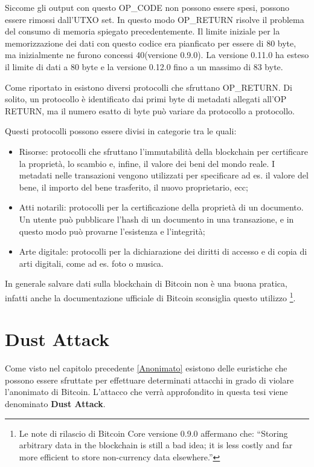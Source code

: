 Siccome gli output con questo OP\_CODE non possono essere spesi, possono essere rimossi dall'UTXO set. In questo modo OP\_RETURN risolve il problema del consumo di memoria spiegato precedentemente. Il limite iniziale per la memorizzazione dei dati con questo codice era pianficato per essere di 80 byte, ma inizialmente ne furono concessi 40(versione 0.9.0).  La versione 0.11.0 \cite{v11} ha esteso il limite di dati a 80 byte e la versione 0.12.0 \cite{v12} fino a un massimo di 83 byte. 

Come riportato in \cite{OP_RETURN} esistono diversi protocolli che sfruttano OP\_RETURN. Di solito, un protocollo è identificato dai primi byte di metadati allegati all'OP RETURN, ma il numero esatto di byte può variare da protocollo a
protocollo. 

Questi protocolli possono essere divisi in categorie tra le quali:
\begin{itemize}
    \item Risorse: protocolli che sfruttano l'immutabilità della blockchain per certificare la proprietà, lo scambio e, infine, il valore dei beni del mondo reale. I metadati nelle transazioni vengono utilizzati per specificare ad es. il valore del bene, il importo del bene trasferito, il nuovo proprietario, ecc;  
    \item Atti notarili: protocolli per la certificazione della proprietà di un documento. Un utente può pubblicare l'hash di un documento in una transazione, e in questo modo può provarne l'esistenza e l'integrità;
    \item Arte digitale: protocolli per la dichiarazione dei diritti di accesso e di copia di arti digitali, come ad es. foto o musica.
\end{itemize}
In generale salvare dati sulla blockchain di Bitcoin non è una buona pratica, infatti anche la documentazione ufficiale di Bitcoin sconsiglia questo utilizzo \footnote{Le note di rilascio di  Bitcoin Core versione 0.9.0 affermano che: “Storing arbitrary data in the blockchain is still a bad idea; it is less costly and far more efficient to store non-currency data elsewhere.”}.
\section{Dust Attack}
Come visto nel capitolo precedente \ref{Anonimato} esistono delle euristiche che possono essere sfruttate per effettuare determinati attacchi in grado di violare l'anonimato di Bitcoin. L'attacco che verrà approfondito in questa tesi viene denominato \textbf{Dust Attack}. 

